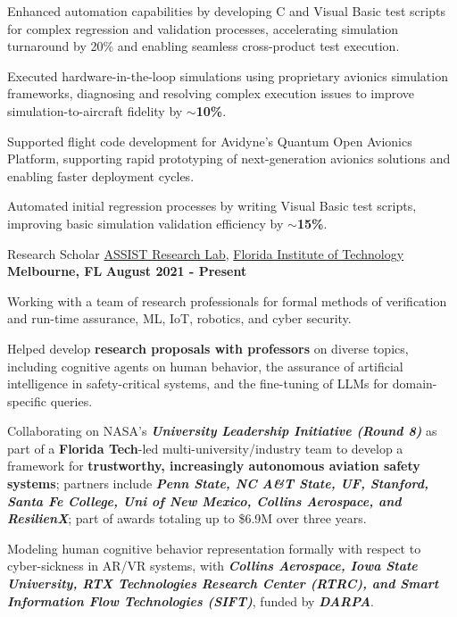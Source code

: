 \begin{cventries}
{\begin{cvitems}
  \item Enhanced automation capabilities by developing C and Visual Basic test scripts for complex regression and validation processes, accelerating simulation turnaround by 20\% and enabling seamless cross-product test execution.
  \item Executed hardware-in-the-loop simulations using proprietary avionics simulation frameworks, diagnosing and resolving complex execution issues to improve simulation-to-aircraft fidelity by $\sim$\textbf{10\%}.
  \item Supported flight code development for Avidyne's Quantum Open Avionics Platform, supporting rapid prototyping of next-generation avionics solutions and enabling faster deployment cycles.
  \item Automated initial regression processes by writing Visual Basic test scripts, improving basic simulation validation efficiency by $\sim$\textbf{15\%}.
\end{cvitems}
}
\cventry
{Research Scholar}
{\href{https://research.fit.edu/assist-lab/}{ASSIST Research Lab}, \href{https://www.fit.edu}{Florida Institute of Technology}}
{\textbf{Melbourne, FL}}
{\textbf{August 2021 - Present}}
{
\begin{cvitems}
\item Working with a team of research professionals for formal methods of verification and run-time assurance, ML, IoT, robotics, and cyber security.
\item Helped develop \textbf{research proposals with professors} on diverse topics, including cognitive agents on human behavior, the assurance of artificial intelligence in safety-critical systems, and the fine-tuning of LLMs for domain-specific queries.
\item Collaborating on NASA’s \textit{\textbf{University Leadership Initiative (Round 8)}} as part of a \textbf{Florida Tech}-led multi-university/industry team to develop a framework for \textbf{trustworthy, increasingly autonomous aviation safety systems}; partners include \textit{\textbf{Penn State, NC A\&T State, UF, Stanford, Santa Fe College, Uni of New Mexico, Collins Aerospace, and ResilienX}}; part of awards totaling up to \$6.9M over three years.
\item Modeling human cognitive behavior representation formally with respect to cyber-sickness in AR/VR systems, with \textit{\textbf{Collins Aerospace, Iowa State University, RTX Technologies Research Center (RTRC), and Smart Information Flow Technologies (SIFT)}}, funded by \textit{\textbf{DARPA}}.

\end{cvitems}}
\end{cventries}

